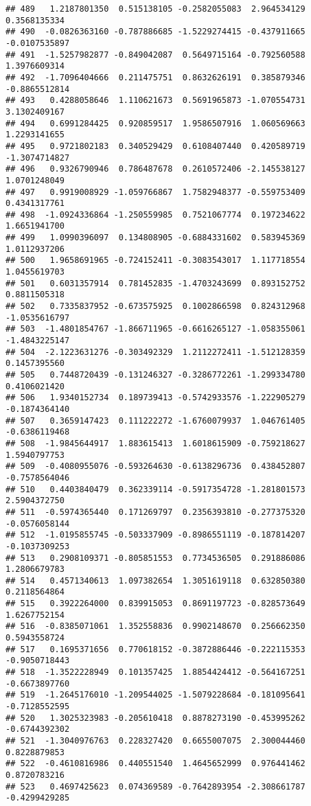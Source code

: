 \documentclass[
]{article}
\begin{document}
\begin{verbatim}
## 489   1.2187801350  0.515138105 -0.2582055083  2.964534129  0.3568135334
## 490  -0.0826363160 -0.787886685 -1.5229274415 -0.437911665 -0.0107535897
## 491  -1.5257982877 -0.849042087  0.5649715164 -0.792560588  1.3976609314
## 492  -1.7096404666  0.211475751  0.8632626191  0.385879346 -0.8865512814
## 493   0.4288058646  1.110621673  0.5691965873 -1.070554731  3.1302409167
## 494   0.6991284425  0.920859517  1.9586507916  1.060569663  1.2293141655
## 495   0.9721802183  0.340529429  0.6108407440  0.420589719 -1.3074714827
## 496   0.9326790946  0.786487678  0.2610572406 -2.145538127  1.0701248049
## 497   0.9919008929 -1.059766867  1.7582948377 -0.559753409  0.4341317761
## 498  -1.0924336864 -1.250559985  0.7521067774  0.197234622  1.6651941700
## 499   1.0990396097  0.134808905 -0.6884331602  0.583945369  1.0112937206
## 500   1.9658691965 -0.724152411 -0.3083543017  1.117718554  1.0455619703
## 501   0.6031357914  0.781452835 -1.4703243699  0.893152752  0.8811505318
## 502   0.7335837952 -0.673575925  0.1002866598  0.824312968 -1.0535616797
## 503  -1.4801854767 -1.866711965 -0.6616265127 -1.058355061 -1.4843225147
## 504  -2.1223631276 -0.303492329  1.2112272411 -1.512128359  0.1457395560
## 505   0.7448720439 -0.131246327 -0.3286772261 -1.299334780  0.4106021420
## 506   1.9340152734  0.189739413 -0.5742933576 -1.222905279 -0.1874364140
## 507   0.3659147423  0.111222272 -1.6760079937  1.046761405 -0.6386119468
## 508  -1.9845644917  1.883615413  1.6018615909 -0.759218627  1.5940797753
## 509  -0.4080955076 -0.593264630 -0.6138296736  0.438452807 -0.7578564046
## 510   0.4403840479  0.362339114 -0.5917354728 -1.281801573  2.5904372750
## 511  -0.5974365440  0.171269797  0.2356393810 -0.277375320 -0.0576058144
## 512  -1.0195855745 -0.503337909 -0.8986551119 -0.187814207 -0.1037309253
## 513   0.2908109371 -0.805851553  0.7734536505  0.291886086  1.2806679783
## 514   0.4571340613  1.097382654  1.3051619118  0.632850380  0.2118564864
## 515   0.3922264000  0.839915053  0.8691197723 -0.828573649  1.6267752154
## 516  -0.8385071061  1.352558836  0.9902148670  0.256662350  0.5943558724
## 517   0.1695371656  0.770618152 -0.3872886446 -0.222115353 -0.9050718443
## 518  -1.3522228949  0.101357425  1.8854424412 -0.564167251 -0.6673897760
## 519  -1.2645176010 -1.209544025 -1.5079228684 -0.181095641 -0.7128552595
## 520   1.3025323983 -0.205610418  0.8878273190 -0.453995262 -0.6744392302
## 521  -1.3040976763  0.228327420  0.6655007075  2.300044460  0.8228879853
## 522  -0.4610816986  0.440551540  1.4645652999  0.976441462  0.8720783216
## 523   0.4697425623  0.074369589 -0.7642893954 -2.308661787 -0.4299429285

\end{verbatim}
\end{document}
